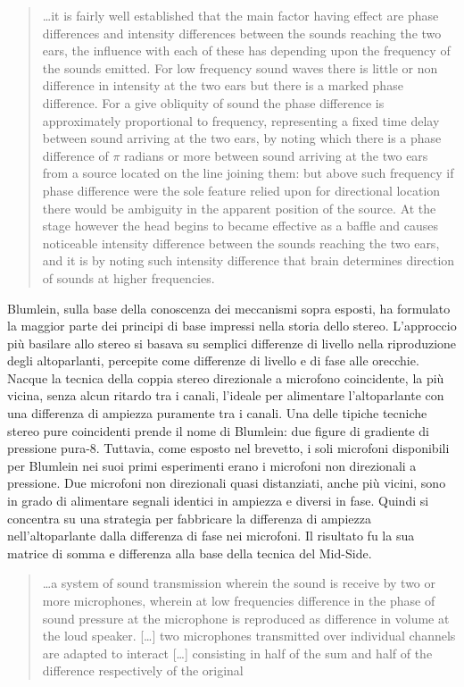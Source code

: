 \begin{quotation}
…it is fairly well established that the main factor having effect are phase
differences and intensity differences between the sounds reaching the two ears,
the influence with each of these has depending upon the frequency of the sounds
emitted. For low frequency sound waves there is little or non difference in
intensity at the two ears but there is a marked phase difference. For a give
obliquity of sound the phase difference is approximately proportional to
frequency, representing a fixed time delay between sound arriving at the two
ears, by noting which there is a phase difference of $\pi$ radians or more
between sound arriving at the two ears from a source located on the line joining
them: but above such frequency if phase difference were the sole feature relied
upon for directional location there would be ambiguity in the apparent position
of the source. At the stage however the head begins to became effective as a
baffle and causes noticeable intensity difference between the sounds reaching
the two ears, and it is by noting such intensity difference that brain
determines direction of sounds at higher frequencies. \cite{ab58}
\end{quotation}

Blumlein, sulla base della conoscenza dei meccanismi sopra esposti, ha formulato
la maggior parte dei principi di base impressi nella storia dello stereo.
L'approccio più basilare allo stereo si basava su semplici differenze di livello
nella riproduzione degli altoparlanti, percepite come differenze di livello e di
fase alle orecchie. Nacque la tecnica della coppia stereo direzionale a
microfono coincidente, la più vicina, senza alcun ritardo tra i canali,
l'ideale per alimentare l'altoparlante con una differenza di ampiezza puramente
tra i canali. Una delle tipiche tecniche stereo pure coincidenti prende il nome
di Blumlein: due figure di gradiente di pressione pura-8. Tuttavia, come esposto
nel brevetto, i soli microfoni disponibili per Blumlein nei suoi primi
esperimenti erano i microfoni non direzionali a pressione. Due microfoni non
direzionali quasi distanziati, anche più vicini, sono in grado di alimentare
segnali identici in ampiezza e diversi in fase. Quindi si concentra su una
strategia per fabbricare la differenza di ampiezza nell'altoparlante dalla
differenza di fase nei microfoni. Il risultato fu la sua matrice di somma e
differenza alla base della tecnica del Mid-Side.

\begin{quotation}
\ldots a system of sound transmission wherein the sound
is receive by two or more microphones, wherein at low frequencies difference in
the phase of sound pressure at the microphone is reproduced as difference in
volume at the loud speaker. [\ldots] two microphones transmitted over individual
channels are adapted to interact [\ldots] consisting in half of the sum and half
of the difference respectively of the original \cite{ab58}
\end{quotation}

